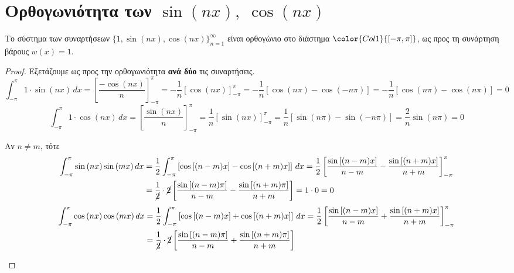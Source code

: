 \documentclass[a4paper,table]{report}
\begin{document}
\section*{Ορθογωνιότητα των \ensuremath{\sin{(nx)}, \; \cos{(nx)}}}

\begin{prop}
  Το σύστημα των συναρτήσεων $ \{1, \sin{(nx), \cos{(nx)} } \} _{n=1}^{\infty} $ 
  είναι ορθογώνιο στο διάστημα $ \color{Col1}{[- \pi , \pi ]} $, ως προς τη 
  συνάρτηση βάρους $ w(x)=1 $.
\end{prop}
\begin{proof}
\item {}
  Εξετάζουμε ως προς την ορθογωνιότητα \textbf{ανά δύο} τις συναρτήσεις.
  \[
    \int _{- \pi}^{\pi} 1 \cdot \sin{(nx)} \,{dx} 
    =  \left[\frac{- \cos{(nx)}}{n} \right]_{- \pi}^{\pi} 
    = - \frac{1}{n} \left[\cos{(nx)} \right]_{- \pi}^{\pi} 
    = - \frac{1}{n} [\cos{(n \pi)} - \cos{(- n \pi)}] 
    = - \frac{1}{n} [\cos{(n \pi)}- \cos{(n \pi)}] = 0 
  \] 
  \[
    \int _{-\pi}^{\pi} 1 \cdot \cos{(nx)} \,{dx} 
    =  \left[\frac{\sin{(nx)}}{n} \right]_{- \pi}^{\pi} 
    = \frac{1}{n} \left[\sin{(nx)} \right]_{- \pi}^{\pi} 
    = \frac{1}{n} [ \sin{(n \pi)} - \sin{(- n \pi)}] =  \frac{2}{n} \sin{(n \pi)} = 0 
  \]
  \begin{myitemize}
    \item Αν $ n \neq m $, τότε
      \begin{align*}
        \int _{-\pi}^{\pi} \sin{(nx)} \sin{(mx)} \,{dx} 
            &=\frac{1}{2} \int_{-\pi}^{\pi} \left[\cos{[(n-m)x]} - \cos{[(n+m)x]}\right]
            \,{dx} 
            = \frac{1}{2} \left[\frac{\sin{[(n-m)x]}}{n-m} - 
            \frac{\sin{[(n+m)x]}}{n+m} \right]_{-\pi}^{\pi} \\
            &= \frac{1}{\cancel{2}} \cdot \cancel{2}  \left[{\frac{\sin{[(n-m)
                  \pi]}}{n-m}} - \frac{\sin{[(n+m)
            \pi]}}{n+m}\right] = 1 \cdot 0 = 0  
      \end{align*} 
      \begin{align*}
        \int _{-\pi}^{\pi} \cos{(nx)} \cos{(mx)} \,{dx} 
            &= \frac{1}{2} \int _{-\pi}^{\pi} \left[\cos{[(n-m)x]} + 
              \cos{[(n+m)x]} \right] \,{dx} 
              = \frac{1}{2} \left[\frac{\sin{[(n-m)x]}}{n-m} 
            + \frac{\sin{[(n+m)x]}}{n+m} \right]_{-\pi}^{\pi} \\
            &= \frac{1}{\cancel{2}} \cdot \cancel{2} \left[ 
              \frac{\sin{[(n-m) \pi]}}{n-m} + \frac{\sin{[(n+m) \pi]}}{n+m}\right] 

\end{align*}
\end{myitemize}
\end{proof}
\end{document}
